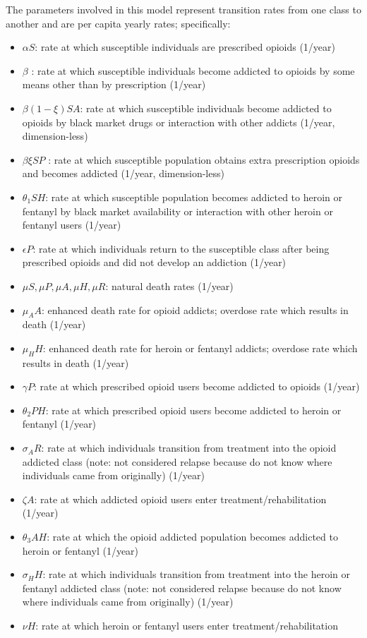 \documentclass[12pt]{article}
\begin{document}
The parameters involved in this model represent transition rates from one class to another and are per capita yearly rates; specifically: 
\begin{itemize}
\item $\alpha S$: rate at which susceptible individuals are prescribed opioids (1/year)
\item $\beta$ : rate at which susceptible individuals become addicted to opioids by some means other than by prescription (1/year)
\item $\beta(1-\xi) SA$: rate at which susceptible individuals become addicted to opioids by black market drugs or interaction with other addicts (1/year, dimension-less)
\item $\beta \xi SP$ : rate at which susceptible population obtains extra prescription opioids and becomes addicted  (1/year, dimension-less)
\item $\theta_1 SH$: rate at which susceptible population becomes addicted to heroin or fentanyl by black market availability or interaction with other heroin or fentanyl users  (1/year)
\item $\epsilon P$: rate at which individuals return to the susceptible class after being prescribed opioids and did not develop an addiction (1/year) 
\item $\mu S, \mu P, \mu A, \mu H, \mu R$: natural death rates (1/year)
\item $\mu_A A$: enhanced death rate for opioid addicts; overdose rate which results in death (1/year)
\item $\mu_H H$: enhanced death rate for heroin or fentanyl addicts; overdose rate which results in death (1/year)
\item $\gamma P$: rate at which prescribed opioid users become addicted to opioids (1/year)
\item $\theta_2 PH$: rate at which prescribed opioid users become addicted to heroin or fentanyl (1/year)
\item $\sigma_A R$: rate at which individuals transition from treatment into the opioid addicted class (note: not considered relapse because do not know where individuals came from originally) (1/year)
\item $\zeta A$: rate at which addicted opioid users enter treatment/rehabilitation (1/year)
\item $\theta_3 AH$: rate at which the opioid addicted population becomes addicted to heroin or fentanyl  (1/year)
\item$\sigma_H H$: rate at which individuals transition from treatment into the heroin or fentanyl addicted class (note: not considered relapse because do not know where individuals came from originally) (1/year)
\item $\nu H$: rate at which heroin or fentanyl users enter treatment/rehabilitation 
\end{itemize}
\end{document}
